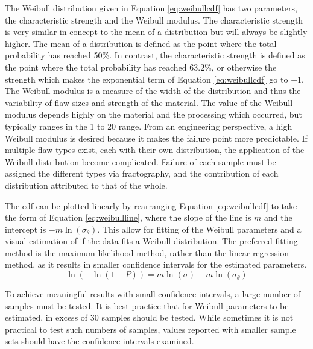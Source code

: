     The Weibull distribution given in Equation \ref{eq:weibullcdf} has two parameters, the characteristic strength and the Weibull modulus.
    The characteristic strength is very similar in concept to the mean of a distribution but will always be slightly higher.
    The mean of a distribution is defined as the point where the total probability has reached 50\%.
    In contrast, the characteristic strength is defined as the point where the total probability has reached 63.2\%, or otherwise the strength which makes the exponential term of Equation \ref{eq:weibullcdf} go to $-1$.
    The Weibull modulus is a measure of the width of the distribution and thus the variability of flaw sizes and strength of the material.
    The value of the Weibull modulus depends highly on the material and the processing which occurred, but typically ranges in the 1 to 20 range.
    From an engineering perspective, a high Weibull modulus is desired because it makes the failure point more predictable.
    If multiple flaw types exist, each with their own distribution, the application of the Weibull distribution become complicated.
    Failure of each sample must be assigned the different types via fractography, and the contribution of each distribution attributed to that of the whole.

    The \gls{cdf} can be plotted linearly by rearranging Equation \ref{eq:weibullcdf} to take the form of Equation \ref{eq:weibullline}, where the slope of the line is $m$ and the intercept is $-m\ln(\sigma_\theta)$.
    This allow for fitting of the Weibull parameters and a visual estimation of if the data fits a Weibull distribution.
    The preferred fitting method is the maximum likelihood method, rather than the linear regression method, as it results in smaller confidence intervals for the estimated parameters.
    \begin{equation}
        \label{eq:weibullline}
        \ln(-\ln(1-P))=m \ln(\sigma) - m\ln(\sigma_\theta)
    \end{equation}

    To achieve meaningful results with small confidence intervals, a large number of samples must be tested.
    It is best practice that for Weibull parameters to be estimated, in excess of 30 samples should be tested.\cite{ASTMStandardC11612018}
    While sometimes it is not practical to test such numbers of samples, values reported with smaller sample sets should have the confidence intervals examined.


